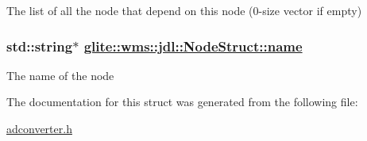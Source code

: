 The list of all the node that depend on this node (0-size vector if empty) \hypertarget{structglite_1_1wms_1_1jdl_1_1NodeStruct_o0}{
\subsubsection[name]{\setlength{\rightskip}{0pt plus 5cm}std::string$\ast$ \hyperlink{structglite_1_1wms_1_1jdl_1_1NodeStruct_o0}{glite::wms::jdl::Node\-Struct::name}}}
\label{structglite_1_1wms_1_1jdl_1_1NodeStruct_o0}


The name of the node 

The documentation for this struct was generated from the following file:\begin{CompactItemize}
\item 
\hyperlink{adconverter_8h}{adconverter.h}\end{CompactItemize}
